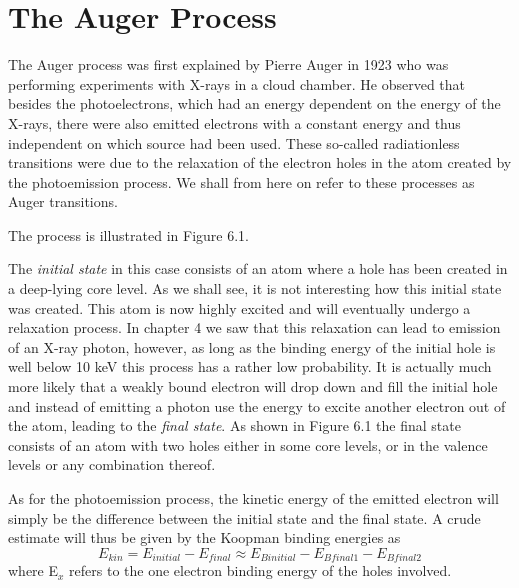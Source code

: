 \chapter{The Auger Process}

             The Auger process was first  explained  by  Pierre  Auger
           in 1923 who was performing experiments  with  X-rays
          in  a  cloud  chamber.  He   observed   that   besides   the
          photoelectrons, which had an energy   dependent  on  the
          energy of the X-rays, there were also emitted electrons  with
          a constant energy and thus independent  on  which  source  had  been
          used. These so-called radiationless transitions were due  to
          the relaxation of the electron holes in the atom created  by
          the photoemission process. We shall from here on refer to
          these processes as Auger transitions.

          The process is illustrated in Figure 6.1.

            The  {\em  initial
          state} in this case consists of an atom where
          a hole has been created in a deep-lying core  level.  As  we
          shall see, it is not interesting how this initial  state  was
          created. This atom is now highly excited and will eventually
          undergo a relaxation process. In chapter 4 we saw that  this
          relaxation can lead to emission of an X-ray photon, however,
          as long as the binding energy of the initial  hole  is  well
          below 10 keV this process has a rather low  probability.  It
          is actually much more likely that a  weakly  bound  electron
          will drop down and fill the  initial  hole  and  instead  of
          emitting a photon use the energy to excite another  electron
          out of the atom, leading to the {\em final state}. As  shown
          in Figure 6.1 the final state consists of an  atom  with  two
          holes either in some core levels, or in the  valence  levels
          or any combination thereof.


             As for the photoemission process, the  kinetic  energy  of
          the emitted electron will simply be the  difference  between
          the initial state and the final state. A crude estimate will
          thus  be  given  by  the   Koopman   binding   energies   as
          \begin{equation} E_{kin}=E_{initial}-E_{final} \approx  E_{B
          initial}-E_{B final1}-E_{B  final  2}  \end{equation}  where
          E$_{x}$ refers to the one electron  binding  energy  of  the
          holes involved.


